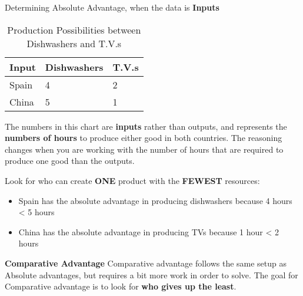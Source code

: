 \begin{example}
    Determining Absolute Advantage, when the data is \textbf{Inputs}
    \begin{table}[h!]
        \begin{center}
            \begin{tabular}{l|l|l}
                \toprule
                \textbf{Input} & \textbf{Dishwashers} & \textbf{T.V.s}\\
                \midrule
                Spain & 4 & 2\\
                China & 5 & 1\\
                \bottomrule
            \end{tabular}
            \caption{Production Possibilities between Dishwashers and T.V.s}
            \label{tab:table3}
        \end{center}
    \end{table}

The numbers in this chart are \textbf{inputs} rather than outputs, and represents the \textbf{numbers of hours} to produce either good in both countries. The reasoning changes when you are working with the number of hours that are required to produce one good than the outputs. 

Look for who can create \textbf{ONE} product with the \textbf{FEWEST} resources:
\begin{itemize}
    \item Spain has the absolute advantage in producing dishwashers because 4 hours < 5 hours
    \item China has the absolute advantage in producing TVs because 1 hour < 2 hours
\end{itemize}
\end{example}
\textbf{Comparative Advantage}
Comparative advantage follows the same setup as Absolute advantages, but requires a bit more work in order to solve. The goal for Comparative advantage is to look for \textbf{who gives up the least}.

